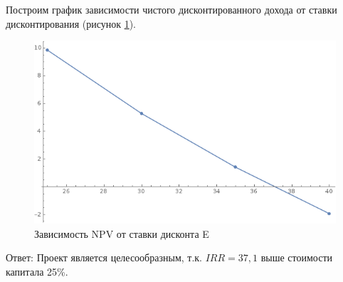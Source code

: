Построим график зависимости чистого дисконтированного дохода от ставки дисконтирования (рисунок \ref{fig:npvegr}).
\begin{figure}[!h]
	\centering
	\includegraphics[width=1\linewidth]{npvegr}
	\caption{Зависимость NPV от ставки дисконта E}
	\label{fig:npvegr}
\end{figure}


Ответ: Проект является целесообразным, т.к. $IRR = 37,1$ выше стоимости капитала 25\%.

